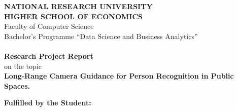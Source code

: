 \pagestyle{empty} %

\begin{center}
    \textup{\textbf{NATIONAL RESEARCH UNIVERSITY} \\ \textbf{HIGHER SCHOOL OF ECONOMICS}} \\[5mm]

     \textup{Faculty of Computer Science  \\ Bachelor’s Programme “Data Science and Business Analytics”} \\[2mm]

 
       \textup{\large\bfseries
         \\[1mm] Research Project Report }\\[5mm] on the topic \\[5mm]
         \textbf{Long-Range Camera Guidance for Person Recognition in Public Spaces.}\\[5mm] 

\end{center}
\vspace{1mm}
\textbf{Fulfilled by the Student:}\\[2mm]



